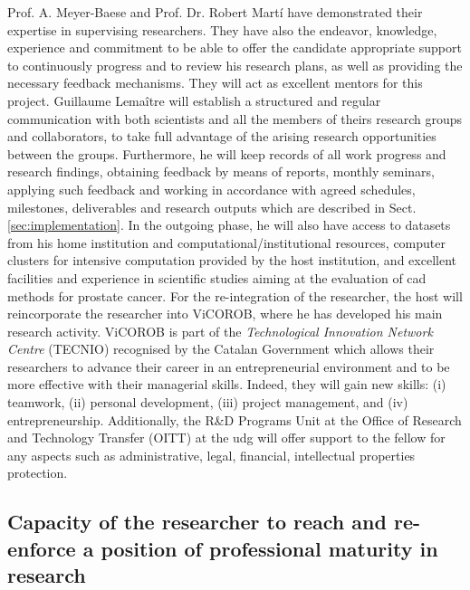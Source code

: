 Prof. A. Meyer-Baese and Prof. Dr. Robert Mart\'i have demonstrated their expertise in supervising researchers. They have also the endeavor, knowledge, experience and commitment to be able to offer the candidate appropriate support to continuously progress and to review his research plans, as well as providing the necessary feedback mechanisms. They will act as excellent mentors for this project.
Guillaume Lema\^itre will establish a structured and regular communication with both scientists and all the members of theirs research groups and collaborators, to take full advantage of the arising research opportunities between the groups. Furthermore, he will keep records of all work progress and research findings, obtaining feedback by means of reports, monthly seminars, applying such feedback and working in accordance with agreed schedules, milestones, deliverables and research outputs which are described in Sect.\,\ref{sec:implementation}.
In the outgoing phase, he will also have access to datasets from his home institution and computational/institutional resources, computer clusters for intensive computation provided by the host institution, and excellent facilities and experience in scientific studies aiming at the evaluation of \ac{cad} methods for prostate cancer. 
For the re-integration of the researcher, the host will reincorporate the researcher into ViCOROB, where he has developed his main research activity. 
ViCOROB is part of the \emph{Technological Innovation Network Centre} (TECNIO) recognised by the Catalan Government which allows their researchers to advance their career in an entrepreneurial environment and to be more effective with their managerial skills.
Indeed, they will gain new skills: (i) teamwork, (ii) personal development, (iii) project management, and (iv) entrepreneurship.
Additionally, the R\&D Programs Unit at the Office of Research and Technology Transfer (OITT) at the \ac{udg} will offer support to the fellow for any aspects such as administrative, legal, financial, intellectual properties protection.

\subsection{Capacity of the researcher to reach and re-enforce a position of professional maturity in research}
\label{sec:maturity}

